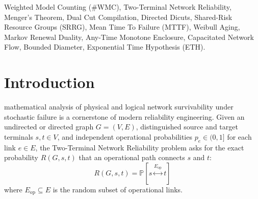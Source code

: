 \documentclass[10pt,journal,compsoc]{IEEEtran}
\begin{document}
{\begin{abstract}
Every compilation produces monotone positive CNF formulas containing strictly physical component variables with \textbf{strictly zero auxiliary routing or flow variables}. We evaluate our framework across 24 empirical suites comprising 2,894 verified runs with 100\% cryptographic SHA-256 ledgers. Dual Cut compilation shatters the planar grid hardness cliff (solving \texttt{grid\_3x7} in 2.13s versus $>$600s timeout) and achieves up to 122$\times$ search node reductions with 100\% exact rational agreement across independent truth-table oracles, Dinic max-flow oracles, and numerical quadrature. Finally, we report on our independent formal audit of OpenAI's claimed subexponential SAT refutation of the Exponential Time Hypothesis (\texttt{openai/math}), documenting the precise multi-process memory ceiling blocker that prevents Lean 4 kernel verification.
\end{abstract}

\begin{IEEEkeywords}
Weighted Model Counting (\#WMC), Two-Terminal Network Reliability, Menger's Theorem, Dual Cut Compilation, Directed Dicuts, Shared-Risk Resource Groups (SRRG), Mean Time To Failure (MTTF), Weibull Aging, Markov Renewal Duality, Any-Time Monotone Enclosure, Capacitated Network Flow, Bounded Diameter, Exponential Time Hypothesis (ETH).
\end{IEEEkeywords}}

\maketitle
\IEEEdisplaynontitleabstractindextext
\IEEEpeerreviewmaketitle

\section{Introduction}
 mathematical analysis of physical and logical network survivability under stochastic failure is a cornerstone of modern reliability engineering. Given an undirected or directed graph $G = (V, E)$, distinguished source and target terminals $s, t \in V$, and independent operational probabilities $p_e \in (0, 1]$ for each link $e \in E$, the Two-Terminal Network Reliability problem asks for the exact probability $R(G, s, t)$ that an operational path connects $s$ and $t$:
\begin{equation}
R(G, s, t) = \mathbb{P}\left[ s \stackrel{E_{\text{op}}}{\longleftrightarrow} t \right]
\end{equation}
where $E_{\text{op}} \subseteq E$ is the random subset of operational links.
\end{document}
